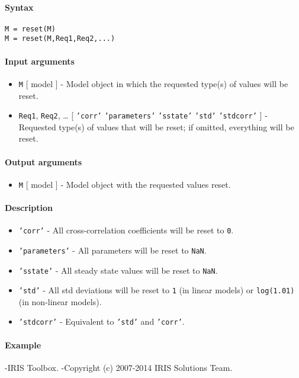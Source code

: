 


	\paragraph{Syntax}\label{syntax}

\begin{verbatim}
M = reset(M)
M = reset(M,Req1,Req2,...)
\end{verbatim}

\paragraph{Input arguments}\label{input-arguments}

\begin{itemize}
\item
  \texttt{M} {[} model {]} - Model object in which the requested type(s)
  of values will be reset.
\item
  \texttt{Req1}, \texttt{Req2}, \ldots{} {[} \texttt{'corr'} \textbar{}
  \texttt{'parameters'} \textbar{} \texttt{'sstate'} \textbar{}
  \texttt{'std'} \textbar{} \texttt{'stdcorr'} {]} - Requested type(s)
  of values that will be reset; if omitted, everything will be reset.
\end{itemize}

\paragraph{Output arguments}\label{output-arguments}

\begin{itemize}
\itemsep1pt\parskip0pt
\item
  \texttt{M} {[} model {]} - Model object with the requested values
  reset.
\end{itemize}

\paragraph{Description}\label{description}

\begin{itemize}
\item
  \texttt{'corr'} - All cross-correlation coefficients will be reset to
  \texttt{0}.
\item
  \texttt{'parameters'} - All parameters will be reset to \texttt{NaN}.
\item
  \texttt{'sstate'} - All steady state values will be reset to
  \texttt{NaN}.
\item
  \texttt{'std'} - All std deviations will be reset to \texttt{1} (in
  linear models) or \texttt{log(1.01)} (in non-linear models).
\item
  \texttt{'stdcorr'} - Equivalent to \texttt{'std'} and \texttt{'corr'}.
\end{itemize}

\paragraph{Example}\label{example}

-IRIS Toolbox. -Copyright (c) 2007-2014 IRIS Solutions Team.



